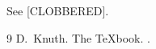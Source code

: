 \documentclass{article}
\def\cite#1{[CLOBBERED]}
\begin{document}
See \cite{knuth}.
\begin{thebibliography}{9}
 D.~Knuth. \newblock The TeXbook. .
\end{thebibliography}
\end{document}
